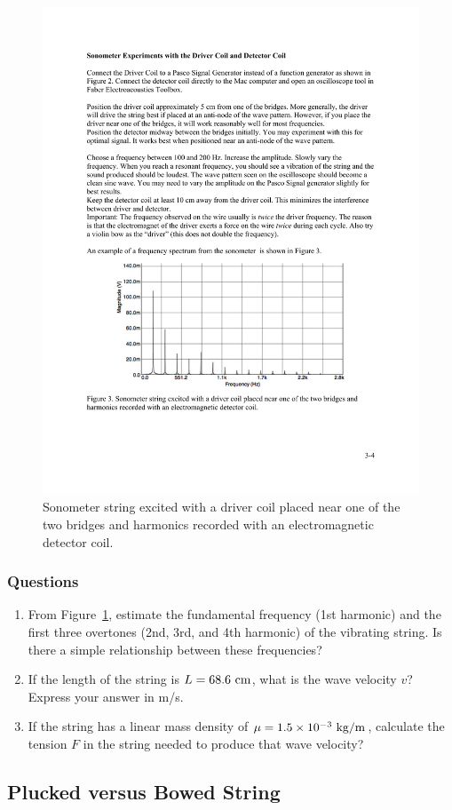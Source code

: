 \documentclass[11pt]{NSF}
\def\ben{\begin{enumerate}}
\def\een{\end{enumerate}}
\def\i{\item{}}
\begin{document}
%
%
\begin{figure}[hbtp] 
\begin{center} 
\includegraphics[width=.7\textwidth]{fig3_3}
\caption{Sonometer string excited with a driver coil placed near one of the 
two bridges and harmonics recorded with an electromagnetic detector coil.}
\label{f:3} 
\end{center} 
\end{figure}
%

\subsubsection*{Questions}
\ben
\i From Figure~\ref{f:3}, estimate the fundamental frequency (1st harmonic)
and the first three overtones (2nd, 3rd, and 4th harmonic) of the vibrating
string.
Is there a simple relationship between these frequencies?

\i If the length of the string is $L=68.6~{\rm cm}$, what is the wave velocity $v$?
Express your answer in m/s.

\i If the string has a linear mass density of $\mu = 1.5\times 10^{-3}~{\rm kg/m}$,
calculate the tension $F$ in the string needed to 
produce that wave velocity? 
\een

\subsection{Plucked versus Bowed String}
\end{document}
